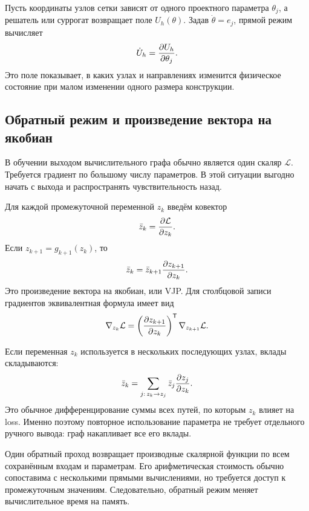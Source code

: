 \begin{connection}
Пусть координаты узлов сетки зависят от одного проектного параметра $\theta_j$, а решатель или суррогат возвращает поле $U_h(\theta)$. Задав $\dot\theta=e_j$, прямой режим вычисляет
\begin{equation}
 \dot U_h
 =
 \frac{\partial U_h}{\partial \theta_j}.
\end{equation}
Это поле показывает, в каких узлах и направлениях изменится физическое состояние при малом изменении одного размера конструкции.
\end{connection}

\subsection{Обратный режим и произведение вектора на якобиан}
В обучении выходом вычислительного графа обычно является один скаляр $\mathcal L$. Требуется градиент по большому числу параметров. В этой ситуации выгодно начать с выхода и распространять чувствительность назад.

Для каждой промежуточной переменной $z_k$ введём ковектор
\begin{equation}
 \bar z_k
 =
 \frac{\partial \mathcal L}{\partial z_k}.
\end{equation}
Если $z_{k+1}=g_{k+1}(z_k)$, то
\begin{equation}
 \bar z_k
 =
 \bar z_{k+1}
 \frac{\partial z_{k+1}}{\partial z_k}.
\end{equation}
Это произведение вектора на якобиан, или VJP. Для столбцовой записи градиентов эквивалентная формула имеет вид
\begin{equation}
 \nabla_{z_k}\mathcal L
 =
 \left(\frac{\partial z_{k+1}}{\partial z_k}\right)^{\mathsf{T}}
 \nabla_{z_{k+1}}\mathcal L.
\end{equation}

Если переменная $z_k$ используется в нескольких последующих узлах, вклады складываются:
\begin{equation}
 \bar z_k
 =
 \sum_{j:\,z_k\to z_j}
 \bar z_j
 \frac{\partial z_j}{\partial z_k}.
\end{equation}
Это обычное дифференцирование суммы всех путей, по которым $z_k$ влияет на loss. Именно поэтому повторное использование параметра не требует отдельного ручного вывода: граф накапливает все его вклады.

Один обратный проход возвращает производные скалярной функции по всем сохранённым входам и параметрам. Его арифметическая стоимость обычно сопоставима с несколькими прямыми вычислениями, но требуется доступ к промежуточным значениям. Следовательно, обратный режим меняет вычислительное время на память.

